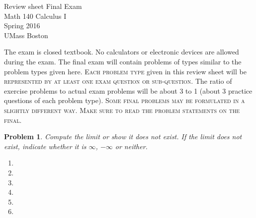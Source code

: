 \documentclass{article}
\renewcommand{\fcProblemRef}{\theproblem.\theenumi}
\newtheorem{problem}{Problem}
\begin{document}
\begin{center}
\Large
Review sheet Final Exam \\ Math 140 Calculus I \\ \normalsize Spring 2016 \\ UMass Boston
\end{center}


\noindent The exam is closed textbook. {\sc No calculators or electronic devices are allowed during the exam.} The final exam will contain problems of types similar to the problem types given here. \textsc{Each problem type} given in this review sheet will be \textsc{represented by at least one exam question or sub-question}. The ratio of exercise problems to actual exam problems will be about 3 to 1 (about 3 practice questions of each problem type). \textsc{Some final problems may be formulated in a slightly different way. Make sure to read the problem statements on the final.} 

\begin{problem}Compute the limit or show it does not exist. If the limit does not exist, indicate whether it is $\infty$, $-\infty$ or neither.
\begin{multicols}{2}
\begin{enumerate}[ref={\fcProblemRef}]
\item 
\item 
\item 
\item 
\item 
\item 

\end{enumerate}
\end{multicols}
\end{problem}


\end{document}
